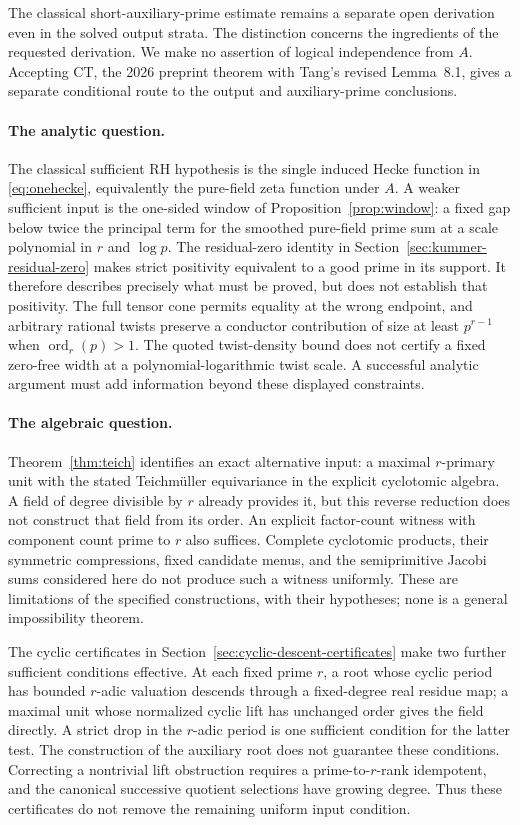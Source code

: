 \documentclass[11pt]{article}
\theoremstyle{definition}
\theoremstyle{remark}
\begin{document}
The classical short-auxiliary-prime estimate remains a separate open
derivation even in the solved output strata. The distinction concerns
the ingredients of the requested derivation. We make no assertion of
logical independence from \(A\). Accepting \(\mathrm{CT}\), the 2026
preprint theorem with Tang's revised Lemma~8.1, gives a separate
conditional route to the output and auxiliary-prime conclusions.

\paragraph{The analytic question.}
The classical sufficient RH hypothesis is the single induced Hecke function in \eqref{eq:onehecke}, equivalently the pure-field zeta function under $A$. A weaker sufficient input is the one-sided window of Proposition~\ref{prop:window}: a fixed gap below twice the principal term for the smoothed pure-field prime sum at a scale polynomial in $r$ and $\log p$. The residual-zero identity in Section~\ref{sec:kummer-residual-zero} makes strict positivity equivalent to a good prime in its support. It therefore describes precisely what must be proved, but does not establish that positivity. The full tensor cone permits equality at the wrong endpoint, and arbitrary rational twists preserve a conductor contribution of size at least $p^{r-1}$ when $\operatorname{ord}_r(p)>1$. The quoted twist-density bound does not certify a fixed zero-free width at a polynomial-logarithmic twist scale. A successful analytic argument must add information beyond these displayed constraints.

\paragraph{The algebraic question.}
Theorem~\ref{thm:teich} identifies an exact alternative input: a maximal $r$-primary unit with the stated Teichm\"uller equivariance in the explicit cyclotomic algebra. A field of degree divisible by $r$ already provides it, but this reverse reduction does not construct that field from its order. An explicit factor-count witness with component count prime to $r$ also suffices. Complete cyclotomic products, their symmetric compressions, fixed candidate menus, and the semiprimitive Jacobi sums considered here do not produce such a witness uniformly. These are limitations of the specified constructions, with their hypotheses; none is a general impossibility theorem.

The cyclic certificates in Section~\ref{sec:cyclic-descent-certificates}
make two further sufficient conditions effective. At each fixed prime \(r\),
a root whose cyclic period has bounded \(r\)-adic valuation descends through a fixed-degree
real residue map; a maximal unit whose normalized cyclic lift has
unchanged order gives the field directly. A strict drop in the
\(r\)-adic period is one sufficient condition for the latter test.
The construction of the auxiliary root does not guarantee these
conditions. Correcting a nontrivial lift obstruction requires a
prime-to-\(r\)-rank idempotent, and the canonical successive quotient
selections have growing degree. Thus these certificates do not remove
the remaining uniform input condition.
\end{document}
